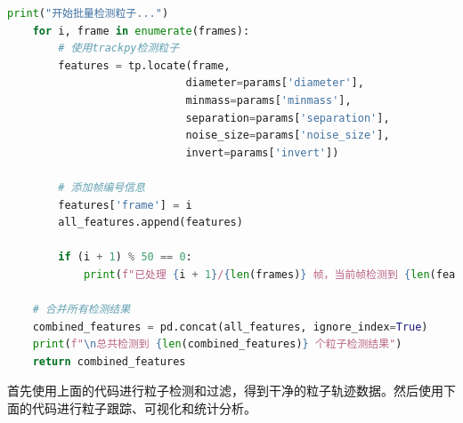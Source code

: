 \documentclass[a4paper]{report} %
\begin{document}
\begin{lstlisting}[language=Python, caption=检测微球, label=code:searchforparticles]
    print("开始批量检测粒子...")
    for i, frame in enumerate(frames):
        # 使用trackpy检测粒子
        features = tp.locate(frame, 
                            diameter=params['diameter'],
                            minmass=params['minmass'],
                            separation=params['separation'],
                            noise_size=params['noise_size'],
                            invert=params['invert'])
        
        # 添加帧编号信息
        features['frame'] = i
        all_features.append(features)
        
        if (i + 1) % 50 == 0:
            print(f"已处理 {i + 1}/{len(frames)} 帧，当前帧检测到 {len(features)} 个粒子")
    
    # 合并所有检测结果
    combined_features = pd.concat(all_features, ignore_index=True)
    print(f"\n总共检测到 {len(combined_features)} 个粒子检测结果")
    return combined_features
\end{lstlisting}
首先使用上面的代码进行粒子检测和过滤，得到干净的粒子轨迹数据。然后使用下面的代码进行粒子跟踪、可视化和统计分析。\\
\end{document}
